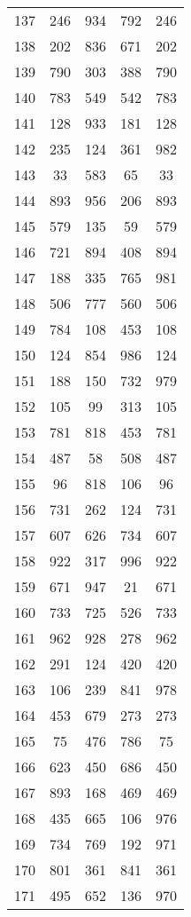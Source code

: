 \documentclass[a4paper,10pt,ngerman]{scrartcl}
\begin{document}
\begin{longtable}[c]{c|c|c|c|c}
    137 & 246 & 934 & 792 & 246 \\
    138 & 202 & 836 & 671 & 202 \\
    139 & 790 & 303 & 388 & 790 \\
    140 & 783 & 549 & 542 & 783 \\
    141 & 128 & 933 & 181 & 128 \\
    142 & 235 & 124 & 361 & 982 \\
    143 & 33 & 583 & 65 & 33 \\
    144 & 893 & 956 & 206 & 893 \\
    145 & 579 & 135 & 59 & 579 \\
    146 & 721 & 894 & 408 & 894 \\
    147 & 188 & 335 & 765 & 981 \\
    148 & 506 & 777 & 560 & 506 \\
    149 & 784 & 108 & 453 & 108 \\
    150 & 124 & 854 & 986 & 124 \\
    151 & 188 & 150 & 732 & 979 \\
    152 & 105 & 99 & 313 & 105 \\
    153 & 781 & 818 & 453 & 781 \\
    154 & 487 & 58 & 508 & 487 \\
    155 & 96 & 818 & 106 & 96 \\
    156 & 731 & 262 & 124 & 731 \\
    157 & 607 & 626 & 734 & 607 \\
    158 & 922 & 317 & 996 & 922 \\
    159 & 671 & 947 & 21 & 671 \\
    160 & 733 & 725 & 526 & 733 \\
    161 & 962 & 928 & 278 & 962 \\
    162 & 291 & 124 & 420 & 420 \\
    163 & 106 & 239 & 841 & 978 \\
    164 & 453 & 679 & 273 & 273 \\
    165 & 75 & 476 & 786 & 75 \\
    166 & 623 & 450 & 686 & 450 \\
    167 & 893 & 168 & 469 & 469 \\
    168 & 435 & 665 & 106 & 976 \\
    169 & 734 & 769 & 192 & 971 \\
    170 & 801 & 361 & 841 & 361 \\
    171 & 495 & 652 & 136 & 970 \\

\end{longtable}
\end{document}
